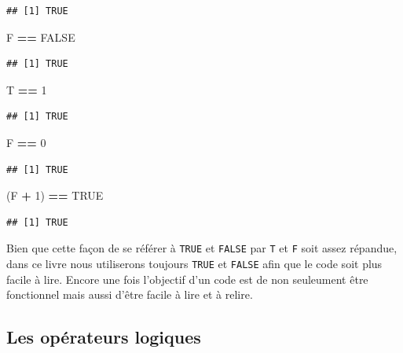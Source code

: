 \documentclass[]{book}
\newenvironment{Shaded}{\begin{snugshade}}{\end{snugshade}}
\newcommand{\DecValTok}[1]{\textcolor[rgb]{0.00,0.00,0.81}{#1}}
\newcommand{\StringTok}[1]{\textcolor[rgb]{0.31,0.60,0.02}{#1}}
\newcommand{\OtherTok}[1]{\textcolor[rgb]{0.56,0.35,0.01}{#1}}
\newcommand{\OperatorTok}[1]{\textcolor[rgb]{0.81,0.36,0.00}{\textbf{#1}}}
\newcommand{\NormalTok}[1]{#1}
\begin{document}
\begin{verbatim}
## [1] TRUE
\end{verbatim}

\begin{Shaded}
\begin{Highlighting}[]
\NormalTok{F }\OperatorTok{==}\StringTok{ }\OtherTok{FALSE}
\end{Highlighting}
\end{Shaded}

\begin{verbatim}
## [1] TRUE
\end{verbatim}

\begin{Shaded}
\begin{Highlighting}[]
\NormalTok{T }\OperatorTok{==}\StringTok{ }\DecValTok{1}
\end{Highlighting}
\end{Shaded}

\begin{verbatim}
## [1] TRUE
\end{verbatim}

\begin{Shaded}
\begin{Highlighting}[]
\NormalTok{F }\OperatorTok{==}\StringTok{ }\DecValTok{0}
\end{Highlighting}
\end{Shaded}

\begin{verbatim}
## [1] TRUE
\end{verbatim}

\begin{Shaded}
\begin{Highlighting}[]
\NormalTok{(F }\OperatorTok{+}\StringTok{ }\DecValTok{1}\NormalTok{) }\OperatorTok{==}\StringTok{ }\OtherTok{TRUE}
\end{Highlighting}
\end{Shaded}

\begin{verbatim}
## [1] TRUE
\end{verbatim}

Bien que cette façon de se référer à \texttt{TRUE} et \texttt{FALSE} par
\texttt{T} et \texttt{F} soit assez répandue, dans ce livre nous
utiliserons toujours \texttt{TRUE} et \texttt{FALSE} afin que le code
soit plus facile à lire. Encore une fois l'objectif d'un code est de non
seuleument être fonctionnel mais aussi d'être facile à lire et à relire.

\subsection{Les opérateurs logiques}\label{les-operateurs-logiques}
\end{document}
